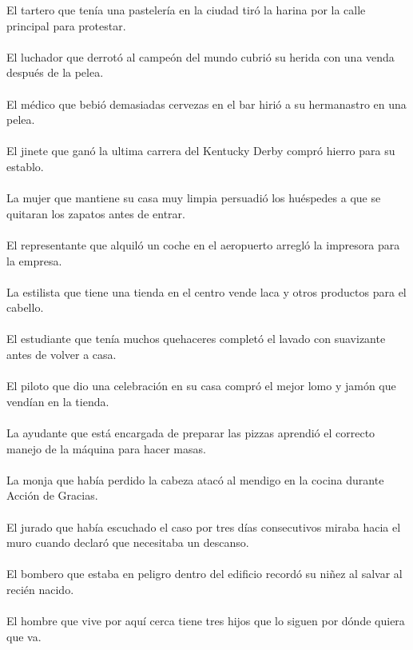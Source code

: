El tartero que tenía una pastelería en la ciudad tiró la harina por la calle principal para protestar.	\\	\\
El luchador que derrotó al campeón del mundo cubrió su herida con una venda después de la pelea.	\\	\\
El médico que bebió demasiadas cervezas en el bar hirió a su hermanastro en una pelea.	\\	\\
El jinete que ganó la ultima carrera del Kentucky Derby compró hierro para su establo.	\\	\\
La mujer que mantiene su casa muy limpia persuadió los huéspedes a que se quitaran los zapatos antes de entrar.	\\	\\
El representante que alquiló un coche en el aeropuerto arregló la impresora para la empresa.	\\	\\
La estilista que tiene una tienda en el centro vende laca y otros productos para el cabello.	\\	\\
El estudiante que tenía muchos quehaceres completó el lavado con suavizante antes de volver a casa.	\\	\\
El piloto que dio una celebración en su casa compró el mejor lomo y jamón que vendían en la tienda.	\\	\\
La ayudante que está encargada de preparar las pizzas aprendió el correcto manejo de la máquina para hacer masas.	\\	\\
La monja que había perdido la cabeza atacó al mendigo en la cocina durante Acción de Gracias.	\\	\\
El  jurado que había escuchado el caso por tres días consecutivos miraba hacia el muro cuando declaró que necesitaba un descanso.	\\	\\
El bombero que estaba en peligro dentro del edificio recordó su niñez al salvar al recién nacido.	\\	\\
El hombre que vive por aquí cerca tiene tres hijos que lo siguen por dónde quiera que va.	\\	\\
